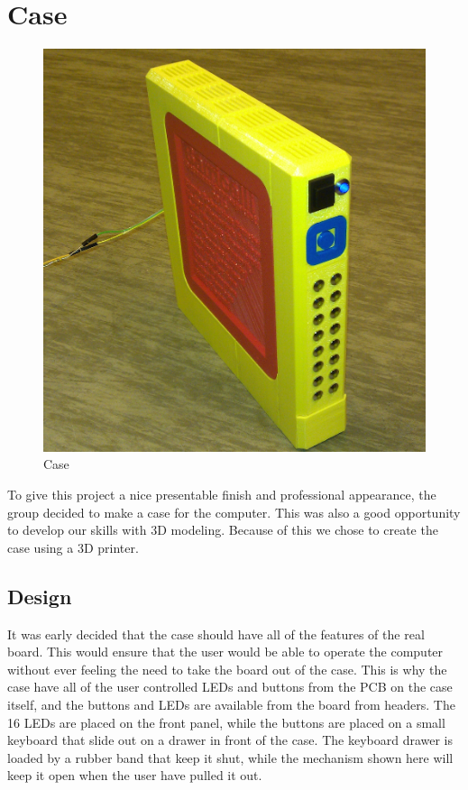 \section{Case}

\begin{figure}[H]
\includegraphics[width=\textwidth,keepaspectratio,clip]{additional-components/case.jpg}%
\caption{Case}
\end{figure}

To give this project a nice presentable finish and professional appearance, the group decided to make a case for the computer.
This was also a good opportunity to develop our skills with 3D modeling.
Because of this we chose to create the case using a 3D printer.

\subsection {Design}

It was early decided that the case should have all of the features of the real board.
This would ensure that the user would be able to operate the computer without ever feeling the need to take the board out of the case.
This is why the case have all of the user controlled LEDs and buttons from the PCB on the case itself, and the buttons and LEDs are available from the board from headers.
The 16 LEDs are placed on the front panel, while the buttons are placed on a small keyboard that slide out on a drawer in front of the case.
The keyboard drawer is loaded by a rubber band that keep it shut, while the mechanism shown here will keep it open when the user have pulled it out.

